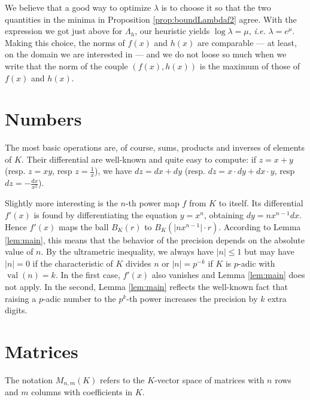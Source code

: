 \documentclass{sig-alternate}
\DeclareMathOperator{\val}{val}
\begin{document}
We believe that a good way to optimize $\lambda$ is to choose it so that 
the two quantities in the minima in Proposition \ref{prop:boundLambdaf2} 
agree. With the expression we got just above for $\Lambda_h$, our 
heuristic yields $\log \lambda = \mu$, \emph{i.e.} $\lambda = e^\mu$.
Making this choice, the norms of $f(x)$ and $h(x)$ are comparable --- 
at least, on the domain we are interested in --- and we do not loose so 
much when we write that the norm of the couple $(f(x), h(x))$ is the 
maximum of those of $f(x)$ and $h(x)$.

{\color{Bittersweet}

\section{Numbers}
\label{sec:numbers}

The most basic operations are, of course, sums, products and inverses of
elements of $K$. Their differential are well-known and quite easy to
compute: if $z = x + y$ (resp. $z = xy$, resp $z = \frac 1 x$), we have
$dz = dx + dy$ (resp. $dz = x \cdot dy + dx \cdot y$, resp $dz = -
\frac{dx}{x^2}$).

Slightly more interesting is the $n$-th power map $f$ from $K$ to
itself. Its differential $f'(x)$ is found by differentiating the
equation $y = x^n$, obtaining $dy = n x^{n-1} dx$.
Hence $f'(x)$ maps the ball $B_K(r)$ to $B_K(\lvert nx^{n-1} \rvert \cdot r)$. According to Lemma \ref{lem:main}, this
means that the behavior of the precision depends on the absolute value
of $n$. By the ultrametric inequality, we always have $\lvert n \rvert \leq 1$ but
may have $\lvert n \rvert = 0$ if the characteristic of $K$ divides $n$ or
$\lvert n \rvert = p^{-k}$ if $K$ is $p$-adic with $\val(n) = k$.  In the first case,
$f'(x)$ also vanishes and Lemma \ref{lem:main} does
not apply.  In the second, Lemma \ref{lem:main} reflects the well-known fact that
raising a $p$-adic number to the $p^k$-th power increases the precision
by $k$ extra digits.

}

\section{Matrices}
\label{sec:matrices}


The notation $M_{n,m}(K)$ refers to the $K$-vector space of matrices 
with $n$ rows and $m$ columns with coefficients in $K$.
\end{document}
